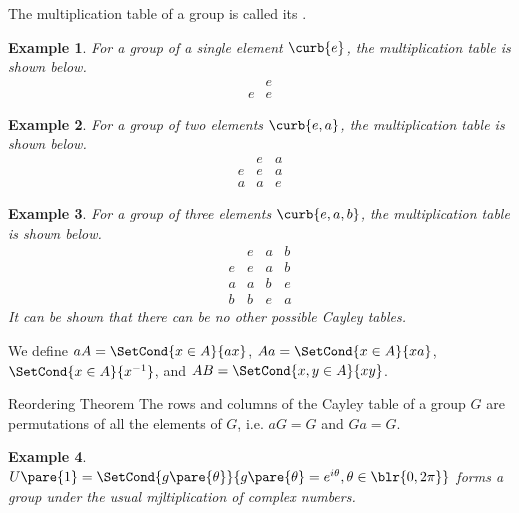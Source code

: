 \documentclass[hidelinks]{article}
\newtheorem{example}{Example}
\begin{document}
The multiplication table of a group is called its .
\begin{sample}
    \begin{example}
        For a group of a single element $\curb{e}$, the multiplication table is shown below.
        \[ \begin{array}{c|c}
         & e \\
        \hline
        e & e    
        \end{array} \]
    \end{example}
\end{sample}
\begin{sample}
    \begin{example}
        For a group of two elements $\curb{e,a}$, the multiplication table is shown below.
        \[ \begin{array}{c|cc}
         & e & a \\
        \hline
        e & e & a \\
        a & a & e
        \end{array} \]
    \end{example}
\end{sample}
\begin{sample}
    \begin{example}
        For a group of three elements $\curb{e,a,b}$, the multiplication table is shown below.
        \[ \begin{array}{c|ccc}
         & e & a & b \\
        \hline
        e & e & a & b \\
        a & a & b & e  \\
        b & b & e & a
        \end{array} \]
        It can be shown that there can be no other possible Cayley tables.
    \end{example}
\end{sample}
We define $aA = \SetCond{x\in A}{ax}$, $Aa = \SetCond{x\in A}{xa}$, $\SetCond{x\in A}{x^{-1}}$, and $AB = \SetCond{x,y\in A}{xy}$.
\begin{finaleq}{Reordering Theorem}
    The rows and columns of the Cayley table of a group $G$ are permutations of all the elements of $G$, i.e. $aG = G$ and $Ga = G$.
\end{finaleq}
\begin{sample}
    \begin{example}
        $U\pare{1} = \SetCond{g\pare{\theta}}{g\pare{\theta}=e^{i\theta},\theta\in\blr{0,2\pi}}$ forms a group under the usual mjltiplication of complex numbers.
    \end{example}
\end{sample}
\end{document}
